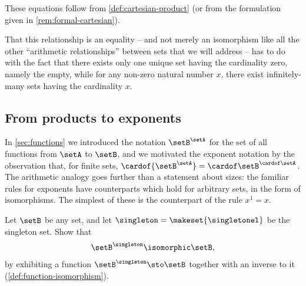 These equations follow from \cref{def:cartesian-product} (or from the formulation given in \cref{rem:formal-cartesian}).


That this relationship is an equality -- and not merely an isomorphism like all the other ``arithmetic relationships'' between sets that we will address -- has to do with the fact that there exists only one unique set having the cardinality zero, namely the empty, while for any non-zero natural number $x$, there exist infinitely-many sets having the cardinality $x$.



\subsection{From products to exponents}


In \cref{sec:functions} we introduced the notation $\setB^{\setA}$ for the set of all functions from $\setA$ to $\setB$, and we motivated the exponent notation by the observation that, for finite sets, $\cardof{\setB^{\setA}} = {\cardof \setB}^{\cardof \setA}$.
The arithmetic analogy goes further than a statement about sizes: the familiar rules for exponents have counterparts which hold for arbitrary sets, in the form of isomorphisms.
The simplest of these is the counterpart of the rule $x^1 = x$.
\begin{exercise}
    \label{ex:functions-out-of-a-singleton}
    Let $\setB$ be any set, and let $\singleton = \makeset{\singletonel}$ be the singleton set.
    Show that
    \begin{equation}
        \label{eq:exponent-singleton}
        \setB^{\singleton} \isomorphic \setB,
    \end{equation}
    by exhibiting a function $\setB^{\singleton} \sto \setB$ together with an inverse to it (\cref{def:function-isomorphism}).
\end{exercise}

